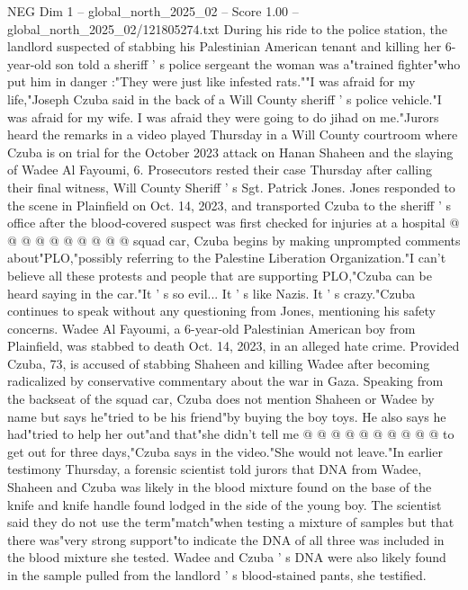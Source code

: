 \begin{textsample}{NEG Dim 1 – global\_north\_2025\_02 – Score 1.00 – global\_north\_2025\_02/121805274.txt}  \label{ex:f1_neg_002}
During his ride to the police station, the landlord suspected of stabbing his Palestinian American tenant and killing her 6-year-old son told a sheriff ' s police sergeant the woman was a"trained fighter"who put him in danger :"They were just like infested rats.""I was afraid for my life,"Joseph Czuba said in the back of a Will County sheriff ' s police vehicle."I was afraid for my wife.
I was afraid they were going to do jihad on me."Jurors heard the remarks in a video played Thursday in a Will County courtroom where Czuba is on trial for the October 2023 attack on Hanan Shaheen and the slaying of Wadee Al Fayoumi, 6.
Prosecutors rested their case Thursday after calling their final witness, Will County Sheriff ' s Sgt.
Patrick Jones.
Jones responded to the scene in Plainfield on Oct. 14, 2023, and transported Czuba to the sheriff ' s office after the blood-covered suspect was first checked for injuries at a hospital @ @ @ @ @ @ @ @ @ @ squad car, Czuba begins by making unprompted comments about"PLO,"possibly referring to the Palestine Liberation Organization."I can't believe all these protests and people that are supporting PLO,"Czuba can be heard saying in the car."It ' s so evil...
It ' s like Nazis.
It ' s crazy."Czuba continues to speak without any questioning from Jones, mentioning his safety concerns.
Wadee Al Fayoumi, a 6-year-old Palestinian American boy from Plainfield, was stabbed to death Oct. 14, 2023, in an alleged hate crime.
Provided Czuba, 73, is accused of stabbing Shaheen and killing Wadee after becoming radicalized by conservative commentary about the war in Gaza.
Speaking from the backseat of the squad car, Czuba does not mention Shaheen or Wadee by name but says he"tried to be his friend"by buying the boy toys.
He also says he had"tried to help her out"and that"she didn't tell me @ @ @ @ @ @ @ @ @ @ to get out for three days,"Czuba says in the video."She would not leave."In earlier testimony Thursday, a forensic scientist told jurors that DNA from Wadee, Shaheen and Czuba was likely in the blood mixture found on the base of the knife and knife handle found lodged in the side of the young boy.
The scientist said they do not use the term"match"when testing a mixture of samples but that there was"very strong support"to indicate the DNA of all three was included in the blood mixture she tested.
Wadee and Czuba ' s DNA were also likely found in the sample pulled from the landlord ' s blood-stained pants, she testified.

\end{textsample}
